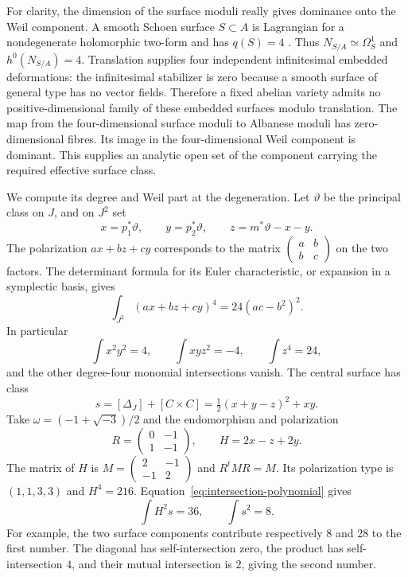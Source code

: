 For clarity, the dimension of the surface moduli really gives dominance onto the Weil component. A smooth Schoen surface $S\subset A$ is Lagrangian for a nondegenerate holomorphic two-form and has $q(S)=4$ \cite[Introduction]{RRS}. Thus $N_{S/A}\simeq\Omega_S^1$ and $h^0(N_{S/A})=4$. Translation supplies four independent infinitesimal embedded deformations: the infinitesimal stabilizer is zero because a smooth surface of general type has no vector fields. Therefore a fixed abelian variety admits no positive-dimensional family of these embedded surfaces modulo translation. The map from the four-dimensional surface moduli to Albanese moduli has zero-dimensional fibres. Its image in the four-dimensional Weil component is dominant. This supplies an analytic open set of the component carrying the required effective surface class.

We compute its degree and Weil part at the degeneration. Let $\vartheta$ be the principal class on $J$, and on $J^2$ set
\[
 x=p_1^*\vartheta,\qquad y=p_2^*\vartheta,\qquad
 z=m^*\vartheta-x-y.
\]
The polarization $a x+b z+c y$ corresponds to the matrix
$\left(\begin{smallmatrix}a&b\\b&c\end{smallmatrix}\right)$ on the two factors. The determinant formula for its Euler characteristic, or expansion in a symplectic basis, gives
\begin{equation}\label{eq:intersection-polynomial}
 \int_{J^2}(a x+b z+c y)^4=24(ac-b^2)^2.
\end{equation}
In particular
\[
 \int x^2y^2=4,\qquad \int xyz^2=-4,\qquad
 \int z^4=24,
\]
and the other degree-four monomial intersections vanish. The central surface has class
\[
 s=[\Delta_J]+[C\times C]
   =\tfrac12(x+y-z)^2+xy.
\]
Take $\omega=(-1+\sqrt{-3})/2$ and the endomorphism and polarization
\[
 R=\begin{pmatrix}0&-1\\1&-1\end{pmatrix},\qquad
 H=2x-z+2y.
\]
The matrix of $H$ is $M=\left(\begin{smallmatrix}2&-1\\-1&2\end{smallmatrix}\right)$ and $R^tMR=M$. Its polarization type is $(1,1,3,3)$ and $H^4=216$. Equation~\eqref{eq:intersection-polynomial} gives
\[
 \int H^2s=36,\qquad \int s^2=8.
\]
For example, the two surface components contribute respectively $8$ and $28$ to the first number. The diagonal has self-intersection zero, the product has self-intersection $4$, and their mutual intersection is $2$, giving the second number.

